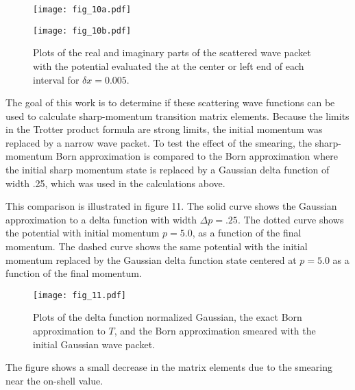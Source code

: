 \documentclass[aps,prc,reprint,noshowpacs,groupedaddress,onecolumn]{revtex4}
\begin{document}
\begin{figure}
\caption{Plots of the real and imaginary parts of the scattered wave packet
with the potential evaluated the at the center or left end of each
interval for $\delta x=0.005$.
}
\begin{minipage}[t]{.45\linewidth} 
\centering
\texttt{[image: fig\_10a.pdf]}
\end{minipage}
\begin{minipage}[t]{.45\linewidth}
\centering
\texttt{[image: fig\_10b.pdf]}
\end{minipage}
\label{figure 10}
\end{figure}

The goal of this work is to determine if these scattering wave
functions can be used to calculate sharp-momentum transition matrix
elements.  Because the limits in the Trotter product formula are
strong limits, the initial momentum was replaced by a narrow wave
packet.  To test the effect of the smearing, the sharp-momentum Born
approximation is compared to the Born approximation where the initial
sharp momentum state is replaced by a Gaussian delta function of width
.25, which was used in the calculations above.

This comparison is illustrated in figure 11.  The solid curve shows
the Gaussian approximation to a delta function with width $\Delta p=.25$.
The dotted curve shows the potential with initial momentum $p=5.0$,
as a function of the final momentum.  The dashed curve shows the 
same potential with the initial momentum replaced by the Gaussian 
delta function state centered at $p=5.0$ as a function of the final momentum. 
\begin{figure}
\caption{Plots of the delta function normalized Gaussian,
the exact Born approximation to $T$, and the Born approximation
smeared with the initial Gaussian wave packet.}
\centering
\texttt{[image: fig\_11.pdf]} 
\label{figure 11}
\end{figure}  
The figure shows a small decrease in the matrix elements due to 
the smearing near the on-shell value.
 
\end{document}

